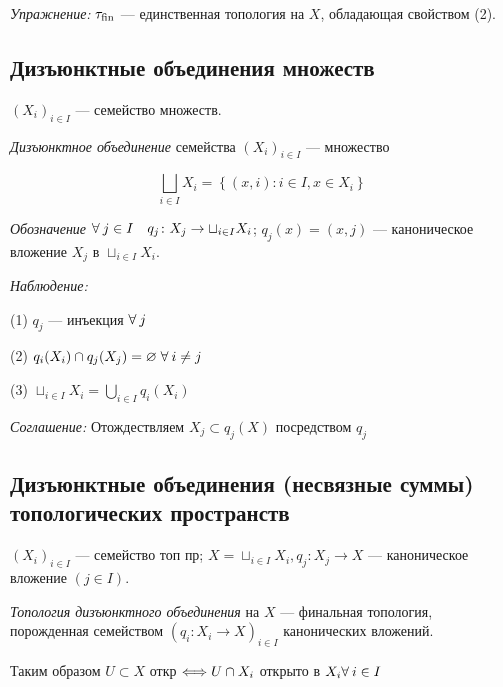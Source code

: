 \documentclass[../../main.tex]{subfiles}
\begin{document}
\textit{Упражнение:} $\tau_{\operatorname{fin}}$ — единственная топология на $X$, обладающая свойством (2).

\subsection{Дизъюнктные объединения множеств}

$(X_i)_{i \in I}$  — семейство множеств.

 \textit{Дизъюнктное объединение} семейства $(X_i)_{i \in I}$ — множество

$$\bigsqcup_{i \in I} X_i = \left\{(x, i) \colon i\in I, x \in X_i \right\}$$

\textit{Обозначение} $\forall\: j \in I \quad  q_j \colon X_j \to \sqcup_{i \in I} X_i$; $q_j(x) = (x, j)$ — каноническое вложение $X_j$ в $\sqcup_{i \in I} X_i$.

\textit{Наблюдение:}

(1) $q_j$ — инъекция $\forall\: j$

(2) $q_i(X_i) \cap q_j(X_j) = \varnothing \; \forall\: i \neq j$

(3) $\sqcup_{i \in I} X_i = \bigcup_{i\in I}q_i(X_i)$

\textit{Соглашение:} Отождествляем $X_j \subset q_j(X)$ посредством $q_j$

\subsection{Дизъюнктные объединения (несвязные суммы) топологических пространств}

$(X_i)_{i \in I}$ — семейство топ пр; $X = \sqcup_{i \in I} X_i, q_j \colon X_j \to X$ — каноническое вложение $(j \in I)$.

 \textit{Топология дизъюнктного объединения} на $X$ — финальная топология, порожденная семейством $(q_i \colon X_i \to X)_{i \in I}$ канонических вложений.

Таким образом $U \subset X$ откр $\Longleftrightarrow U \cap X_i$ открыто в $X_i \forall\: i \in I$
\end{document}
